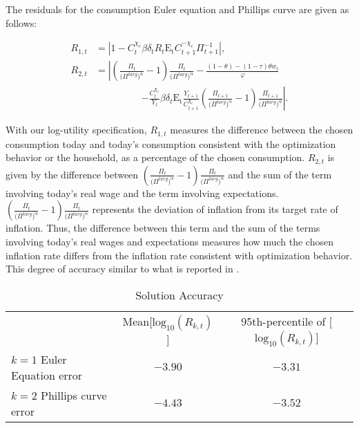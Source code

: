 \documentclass[11pt]{article}
\begin{document}
\begin{singlespace}
	The residuals for the consumption Euler equation and Phillips curve are given as follows: 
	
	\begin{align}
	    R_{1,t} & = \left| 1 - C_{t}^{\chi_{c}}\beta\delta_{t}R_{t}\mathrm{E_{t}}C_{t+1}^{-\chi_{c}}\Pi_{t+1}^{-1} \right|, \\ 
	    R_{2,t} & = \left| \left(\frac{\Pi_{t}}{\bigl(\Pi^{targ}\bigr)^{\alpha}}-1\right)\frac{\Pi_{t}}{\bigl(\Pi^{targ}\bigr)^{\alpha}} - \frac{(1-\theta)- (1-\tau)\theta w_{t}}{\varphi}  \nonumber \right. \\ 
	    & \hspace{2cm} \left. - \frac{C_{t}^{\chi_{c}}}{Y_{t}}\beta\delta_{t}\mathrm{E_{t}}\frac{Y_{t+1}}{C_{t+1}^{\chi_{c}}} \left(\frac{\Pi_{t+1}}{\bigl(\Pi^{targ}\bigr)^{\alpha}}-1\right)\frac{\Pi_{t+1}}{\bigl(\Pi^{targ}\bigr)^{\alpha}} \right|.
	\end{align}
	
	With our log-utility specification, $R_{1,t}$ measures the difference between the chosen consumption today and today's consumption consistent with the optimization behavior or the household, as a percentage of the chosen consumption. $R_{2,t}$ is given by the difference between $\left(\frac{\Pi_{t}}{\bigl(\Pi^{targ}\bigr)^{\alpha}}-1\right)\frac{\Pi_{t}}{\bigl(\Pi^{targ}\bigr)^{\alpha}}$  and the sum of the term involving today's real wage and the term involving expectations. $\left(\frac{\Pi_{t}}{\bigl(\Pi^{targ}\bigr)^{\alpha}}-1\right)\frac{\Pi_{t}}{\bigl(\Pi^{targ}\bigr)^{\alpha}}$ represents the deviation of inflation from its target rate of inflation. Thus, the difference between this term and the sum of the terms involving today's real wages and expectations measures how much the chosen inflation rate differs from the inflation rate consistent with optimization behavior. This degree of accuracy similar to what is reported in \citet{AruobaCubaBordaSchorfheide2018}. 
	
	\begin{table}
			\centering
			\caption{Solution Accuracy\label{T:Accuracy}}
{\footnotesize
			\begin{tabular}{lcc}
				\hline
				 & Mean[$\text{log}_10(R_{k,t})$] & 95th-percentile of [$\text{log}_10(R_{k,t})$]\\
				$k = 1$ Euler Equation error & $-3.90$ & $-3.31$  \\
				$k = 2$ Phillips curve error  & $-4.43$ & $-3.52$  \\
				\hline
			\end{tabular}
}		\end{table}
	
	\end{singlespace}
	
\end{document}
